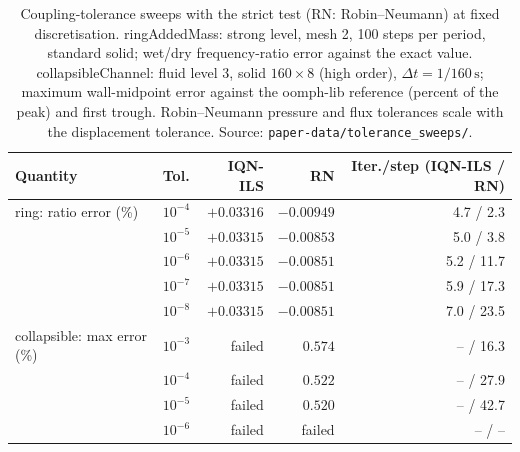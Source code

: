 \begin{table}[htbp]
	\centering
	\small
	\caption{Coupling-tolerance sweeps with the strict test (RN: Robin--Neumann) at fixed discretisation. ringAddedMass: strong level, mesh 2, 100 steps per period, standard solid; wet/dry frequency-ratio error against the exact value. collapsibleChannel: fluid level 3, solid $160\times8$ (high order), $\Delta t = 1/160\,\mathrm{s}$; maximum wall-midpoint error against the oomph-lib reference (percent of the peak) and first trough. Robin--Neumann pressure and flux tolerances scale with the displacement tolerance. Source: \texttt{paper-data/tolerance\_sweeps/}.}
	\label{tab:tol_sweeps}
	\setlength{\tabcolsep}{4pt}
	\begin{tabular}{llrrr}
		\toprule
		Quantity & Tol. & IQN-ILS & RN & Iter./step (IQN-ILS / RN) \\
		\midrule
		ring: ratio error (\%) & $10^{-4}$ & $+0.03316$ & $-0.00949$ & 4.7 / 2.3 \\
		 & $10^{-5}$ & $+0.03315$ & $-0.00853$ & 5.0 / 3.8 \\
		 & $10^{-6}$ & $+0.03315$ & $-0.00851$ & 5.2 / 11.7 \\
		 & $10^{-7}$ & $+0.03315$ & $-0.00851$ & 5.9 / 17.3 \\
		 & $10^{-8}$ & $+0.03315$ & $-0.00851$ & 7.0 / 23.5 \\
		\midrule
		collapsible: max error (\%) & $10^{-3}$ & failed & $0.574$ & -- / 16.3 \\
		 & $10^{-4}$ & failed & $0.522$ & -- / 27.9 \\
		 & $10^{-5}$ & failed & $0.520$ & -- / 42.7 \\
		 & $10^{-6}$ & failed & failed & -- / -- \\
		\bottomrule
	\end{tabular}
\end{table}

